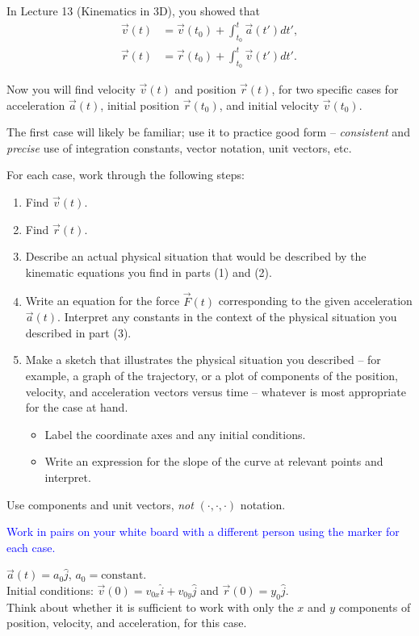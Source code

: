 \documentclass[11pt, letterpaper, openany]{book}
\newenvironment{exercise}[1][Exercise]{%
  \tcolorbox[blanker, breakable, left=1em,
    before skip=1em, after skip=1em,
    borderline west={3pt}{0pt}{PhysNavy},
    colback=PhysCream,
    before upper={\textcolor{PhysNavy}{\sffamily\bfseries #1:}\space}
  ]%
}{%
  \endtcolorbox%
}
\begin{document}
In Lecture 13 (Kinematics in 3D), you showed that
\begin{align*}
    \vec{v}(t) &= \vec{v}(t_0) + \int_{t_0}^t \vec{a}(t')dt', \\
    \vec{r}(t) &= \vec{r}(t_0) + \int_{t_0}^t \vec{v}(t')dt'.
\end{align*}

Now you will find velocity $\vec{v}(t)$ and position $\vec{r}(t)$, for two specific cases for acceleration $\vec{a}(t)$, initial position $\vec{r}(t_0)$, and initial velocity $\vec{v}(t_0)$.

The first case will likely be familiar; use it to practice good form -- \textit{consistent} and \textit{precise} use of integration constants, vector notation, unit vectors, etc.

For each case, work through the following steps:
\begin{enumerate}
    \item Find $\vec{v}(t)$.
    \item Find $\vec{r}(t)$.
    \item Describe an actual physical situation that would be described by the kinematic equations you find in parts (1) and (2).
    \item Write an equation for the force $\vec{F}(t)$ corresponding to the given acceleration $\vec{a}(t)$. Interpret any constants in the context of the physical situation you described in part (3).
    \item Make a sketch that illustrates the physical situation you described -- for example, a graph of the trajectory, or a plot of components of the position, velocity, and acceleration vectors versus time -- whatever is most appropriate for the case at hand.
    \begin{itemize}
        \item Label the coordinate axes and any initial conditions.
        \item Write an expression for the slope of the curve at relevant points and interpret.
    \end{itemize}
\end{enumerate}

Use components and unit vectors, \textit{not} $(\cdot, \cdot, \cdot)$ notation.

\textcolor{blue}{Work in pairs on your white board with a different person using the marker for each case.}

\begin{exercise}[Case A:]
$\vec{a}(t) = a_0\hat{j}$, $a_0 = \text{constant}$. \\
Initial conditions: $\vec{v}(0) = v_{0x}\hat{i} + v_{0y}\hat{j}$ and $\vec{r}(0) = y_0\hat{j}$. \\
Think about whether it is sufficient to work with only the $x$ and $y$ components of position, velocity, and acceleration, for this case.
\end{exercise}
\end{document}
